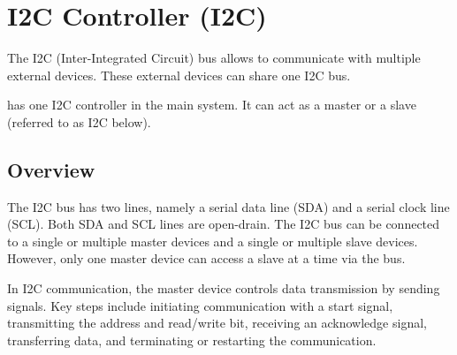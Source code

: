 \documentclass[main\_\_EN.tex]{subfiles}
\begin{document}

\ifglobal
\else
    \listoftodos
    {\let\clearpage\relax \listofdonetodos}
    \tableofcontents
\fi










\hypertarget{i2c}{}
\chapter{I2C Controller (I2C)}
\label{mod:i2c}

The I2C (Inter-Integrated Circuit) bus allows \chipname{} to communicate with multiple external devices. These external devices can share one I2C bus.

\chipname{} has one I2C controller in the main system. It can act as a master or a slave (referred to as I2C below).

\section{Overview}

The I2C bus has two lines, namely a serial data line (SDA) and a serial clock line (SCL). Both SDA and SCL lines are open-drain. The I2C bus can be connected to a single or multiple master devices and a single or multiple slave devices. However, only one master device can access a slave at a time via the bus.

In I2C communication, the master device controls data transmission by sending signals. Key steps include initiating communication with a start signal, transmitting the address and read/write bit, receiving an acknowledge signal, transferring data, and terminating or restarting the communication.
\end{document}
